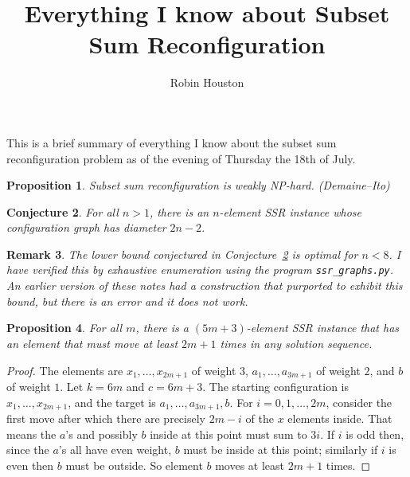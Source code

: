 \documentclass{robinminion}
\author{Robin Houston}
\title{Everything I know about Subset Sum Reconfiguration}
\newtheorem{prop}{Proposition}
\newtheorem{conjecture}[prop]{Conjecture}
\newtheorem{rem}[prop]{Remark}
\begin{document}
\maketitle
\linespread{1.1}\selectfont

\noindent This is a brief summary of everything I know about the subset sum reconfiguration problem as of the evening of Thursday the 18th of July.

\begin{prop}
    Subset sum reconfiguration is weakly NP-hard. \textup(Demaine--Ito\textup)
\end{prop}

\begin{conjecture}\label{conjecture:diameter}
    For all $n>1$, there is an $n$-element SSR instance whose configuration graph has diameter $2n-2$.
\end{conjecture}

\begin{rem}
    The lower bound conjectured in Conjecture~\ref{conjecture:diameter} is optimal for $n<8$. I have verified this by exhaustive enumeration using the program \texttt{ssr\_graphs.py}. An earlier version of these notes had a construction that purported to exhibit this bound, but there is an error and it does not work.
\end{rem}

\begin{prop}\label{prop:element-moves-a-lot}
    For all $m$, there is a $(5m+3)$-element SSR instance that has an element that must move at least $2m+1$ times in any solution sequence.
\end{prop}
\begin{proof}
    The elements are $x_1, \dots, x_{2m+1}$ of weight $3$, $a_1, \dots, a_{3m+1}$ of weight $2$, and $b$ of weight $1$.
    Let $k=6m$ and $c=6m+3$. The starting configuration is $x_1, \dots, x_{2m+1}$, and the target is $a_1, \dots, a_{3m+1}, b$. For $i=0, 1, \dots, 2m$, consider the first move after which there are precisely $2m-i$ of the $x$ elements inside. That means the $a$'s and possibly $b$ inside at this point must sum to $3i$. If $i$ is odd then, since the $a$'s all have even weight, $b$ must be inside at this point; similarly if $i$ is even then $b$ must be outside. So element $b$ moves at least $2m+1$ times.
\end{proof}
\end{document}
